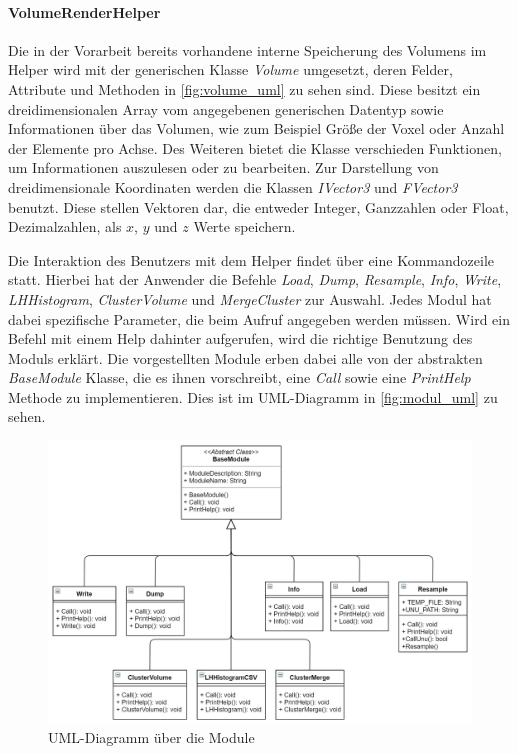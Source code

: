 \paragraph{VolumeRenderHelper}
Die in der Vorarbeit bereits vorhandene interne Speicherung des Volumens im Helper wird mit der generischen Klasse \textit{Volume} umgesetzt, deren Felder, Attribute und Methoden in \autoref{fig:volume_uml} zu sehen sind. Diese besitzt ein dreidimensionalen Array vom angegebenen generischen Datentyp sowie Informationen über das Volumen, wie zum Beispiel Größe der Voxel oder Anzahl der Elemente pro Achse.
Des Weiteren bietet die Klasse verschieden Funktionen, um Informationen auszulesen oder zu bearbeiten. Zur Darstellung von dreidimensionale Koordinaten werden die Klassen \textit{IVector3} und \textit{FVector3} benutzt. Diese stellen Vektoren dar, die entweder Integer, Ganzzahlen oder Float, Dezimalzahlen, als $x$, $y$ und $z$ Werte speichern.


Die Interaktion des Benutzers mit dem Helper findet über eine Kommandozeile statt. Hierbei hat der Anwender die Befehle \textit{Load}, \textit{Dump}, \textit{Resample}, \textit{Info}, \textit{Write}, \textit{LHHistogram}, \textit{ClusterVolume} und \textit{MergeCluster} zur Auswahl. Jedes Modul hat dabei spezifische Parameter, die beim Aufruf angegeben werden müssen. Wird ein Befehl mit einem Help dahinter aufgerufen, wird die richtige Benutzung des Moduls erklärt.
Die vorgestellten Module erben dabei alle von der abstrakten \textit{BaseModule} Klasse, die es ihnen vorschreibt, eine \textit{Call} sowie eine \textit{PrintHelp} Methode zu implementieren. Dies ist im UML-Diagramm in \autoref{fig:modul_uml} zu sehen.


\begin{figure}[h]
\centering 
\includegraphics[width=\textwidth]{Logos/Modules_UML.PNG}
\caption{UML-Diagramm über die Module} 
\label{fig:modul_uml} 
\end{figure}


